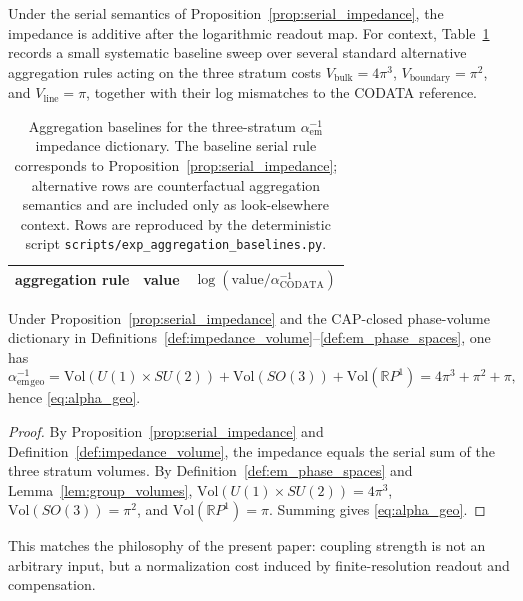 \begin{remark}\label{rem:alpha_aggregation_isolation}
Under the serial semantics of Proposition~\ref{prop:serial_impedance}, the impedance is additive after the logarithmic readout map.
For context, Table~\ref{tab:alpha_aggregation_baselines} records a small systematic baseline sweep over several standard alternative aggregation rules acting on the three stratum costs $V_{\mathrm{bulk}}=4\pi^3$, $V_{\mathrm{boundary}}=\pi^2$, and $V_{\mathrm{line}}=\pi$, together with their log mismatches to the CODATA reference.
\end{remark}

\begin{table}[t]
\centering
\small
\setlength{\tabcolsep}{10pt}
\renewcommand{\arraystretch}{1.15}
\begin{tabular}{lcc}
\toprule
aggregation rule & value & $\log(\mathrm{value}/\alpha^{-1}_{\mathrm{CODATA}})$ \\
\midrule
%
\end{tabular}
\caption{Aggregation baselines for the three-stratum $\alpha_{\mathrm{em}}^{-1}$ impedance dictionary.
The baseline serial rule corresponds to Proposition~\ref{prop:serial_impedance}; alternative rows are counterfactual aggregation semantics and are included only as look-elsewhere context. Rows are reproduced by the deterministic script \texttt{scripts/exp\_aggregation\_baselines.py}.}
\label{tab:alpha_aggregation_baselines}
\end{table}
\begin{theorem}\label{thm:alpha_three_channel}
Under Proposition~\ref{prop:serial_impedance} and the CAP-closed phase-volume dictionary in Definitions~\ref{def:impedance_volume}--\ref{def:em_phase_spaces}, one has
\[
\alpha_{\mathrm{em}}^{-1}{}_{\mathrm{geo}}
=\mathrm{Vol}(U(1)\times SU(2))+\mathrm{Vol}(SO(3))+\mathrm{Vol}(\mathbb{R}P^1)
=4\pi^3+\pi^2+\pi,
\]
hence \eqref{eq:alpha_geo}.
\end{theorem}
\begin{proof}
By Proposition~\ref{prop:serial_impedance} and Definition~\ref{def:impedance_volume}, the impedance equals the serial sum of the three stratum volumes.
By Definition~\ref{def:em_phase_spaces} and Lemma~\ref{lem:group_volumes}, $\mathrm{Vol}(U(1)\times SU(2))=4\pi^3$, $\mathrm{Vol}(SO(3))=\pi^2$, and $\mathrm{Vol}(\mathbb{R}P^1)=\pi$.
Summing gives \eqref{eq:alpha_geo}.
\end{proof}
This matches the philosophy of the present paper: coupling strength is not an arbitrary input, but a normalization cost induced by finite-resolution readout and compensation.
